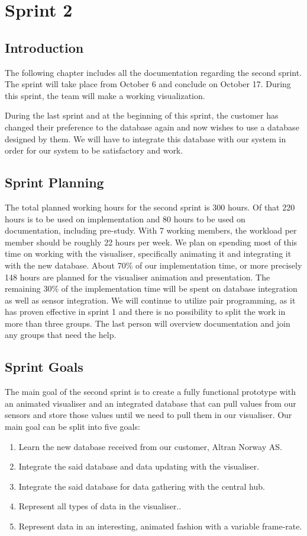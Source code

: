 \documentclass[../document]{subfiles}
\begin{document}
\section{Sprint 2}
\subsection{Introduction}
The following chapter includes all the documentation regarding the second sprint. The sprint will take place from October 6 and conclude on October 17. During this sprint, the team will make a working visualization.

During the last sprint and at the beginning of this sprint, the customer has changed their preference to the database again and now wishes to use a database designed by them. We will have to integrate this database with our system in order for our system to be satisfactory and work.

\subsection{Sprint Planning}
The total planned working hours for the second sprint is 300 hours. Of that 220 hours is to be used on implementation and 80 hours to be used on documentation, including pre-study. With 7 working members, the workload per member should be roughly 22 hours per week. We plan on spending most of this time on working with the visualiser, specifically animating it and integrating it with the new database. About 70\% of our implementation time, or more precisely 148 hours are planned for the visualiser animation and presentation. The remaining 30\% of the implementation time will be spent on database integration as well as sensor integration. We will continue to utilize pair programming, as it has proven effective in sprint 1 and there is no possibility to split the work in more than three groups. The last person will overview documentation and join any groups that need the help. 

\newpage
\subsection{Sprint Goals}
The main goal of the second sprint is to create a fully functional prototype with an animated visualiser and an integrated database that can pull values from our sensors and store those values until we need to pull them in our visualiser. Our main goal can be split into five goals:
\begin{enumerate}
\item
Learn the new database received from our customer, \gls{Altran} Norway AS.
\item
Integrate the said database and data updating with the visualiser.
\item
Integrate the said database for data gathering with the central hub.
\item
Represent all types of data in the visualiser..
\item
Represent data in an interesting, animated fashion with a variable frame-rate.
\end{enumerate}
\end{document}
